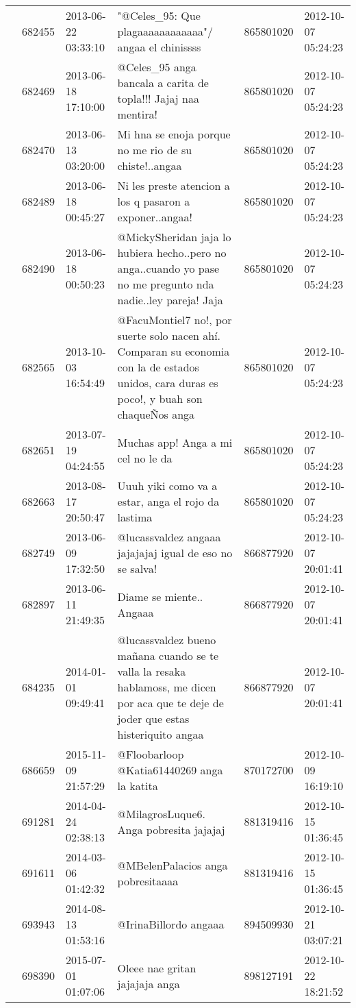 \begin{tabular}{llllrl}
 & 682455& 2013-06-22 03:33:10 &"@Celes\_95: Que plagaaaaaaaaaaaa"/ angaa el chinissss & 865801020 & 2012-10-07 05:24:23 \\
 & 682469& 2013-06-18 17:10:00 & @Celes\_95 anga bancala a carita de topla!!! Jajaj naa mentira! & 865801020 & 2012-10-07 05:24:23 \\
 & 682470& 2013-06-13 03:20:00 &Mi hna se enoja porque no me rio de su chiste!..angaa & 865801020 & 2012-10-07 05:24:23 \\
 & 682489& 2013-06-18 00:45:27 & Ni les preste atencion a los q pasaron a exponer..angaa! & 865801020 & 2012-10-07 05:24:23 \\
 & 682490& 2013-06-18 00:50:23 &@MickySheridan jaja lo hubiera hecho..pero no anga..cuando yo pase no me pregunto nda nadie..ley pareja! Jaja & 865801020 & 2012-10-07 05:24:23 \\
 & 682565& 2013-10-03 16:54:49 &@FacuMontiel7 no!, por suerte solo nacen ahí. Comparan su economia con la de estados unidos, cara duras es poco!, y buah son chaqueÑos anga & 865801020 & 2012-10-07 05:24:23 \\
 & 682651& 2013-07-19 04:24:55 & Muchas app! Anga a mi cel no le da & 865801020 & 2012-10-07 05:24:23 \\
 & 682663& 2013-08-17 20:50:47 & Uuuh yiki como va a estar, anga el rojo da lastima & 865801020 & 2012-10-07 05:24:23 \\
 & 682749& 2013-06-09 17:32:50 & @lucassvaldez angaaa jajajajaj igual de eso no se salva! & 866877920 & 2012-10-07 20:01:41 \\
 & 682897& 2013-06-11 21:49:35 & Diame se miente.. Angaaa & 866877920 & 2012-10-07 20:01:41 \\
 & 684235& 2014-01-01 09:49:41 &@lucassvaldez bueno mañana cuando se te valla la resaka hablamoss, me dicen por aca que te deje de joder que estas histeriquito angaa & 866877920 & 2012-10-07 20:01:41 \\
 & 686659& 2015-11-09 21:57:29 & @Floobarloop @Katia61440269 anga la katita & 870172700 & 2012-10-09 16:19:10 \\
 & 691281& 2014-04-24 02:38:13 &@MilagrosLuque6. Anga pobresita jajajaj & 881319416 & 2012-10-15 01:36:45 \\
 & 691611& 2014-03-06 01:42:32 &@MBelenPalacios anga pobresitaaaa & 881319416 & 2012-10-15 01:36:45 \\
 & 693943& 2014-08-13 01:53:16 &@IrinaBillordo angaaa & 894509930 & 2012-10-21 03:07:21 \\
 & 698390& 2015-07-01 01:07:06 & Oleee nae gritan jajajaja anga & 898127191 & 2012-10-22 18:21:52 \\

\end{tabular}
